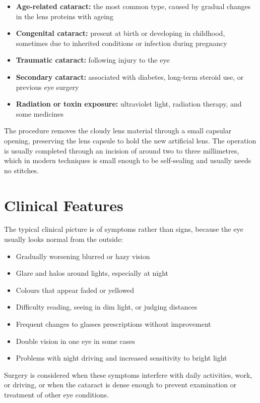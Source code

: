 \begin{itemize}
    \item \textbf{Age-related cataract:} the most common type, caused by gradual changes in the lens proteins with ageing
    \item \textbf{Congenital cataract:} present at birth or developing in childhood, sometimes due to inherited conditions or infection during pregnancy
    \item \textbf{Traumatic cataract:} following injury to the eye
    \item \textbf{Secondary cataract:} associated with diabetes, long-term steroid use, or previous eye surgery
    \item \textbf{Radiation or toxin exposure:} ultraviolet light, radiation therapy, and some medicines
\end{itemize}

The procedure removes the cloudy lens material through a small capsular opening, preserving the lens capsule to hold the new artificial lens. The operation is usually completed through an incision of around two to three millimetres, which in modern techniques is small enough to be self-sealing and usually needs no stitches.

\section*{Clinical Features}
The typical clinical picture is of symptoms rather than signs, because the eye usually looks normal from the outside:

\begin{itemize}
    \item Gradually worsening blurred or hazy vision
    \item Glare and halos around lights, especially at night
    \item Colours that appear faded or yellowed
    \item Difficulty reading, seeing in dim light, or judging distances
    \item Frequent changes to glasses prescriptions without improvement
    \item Double vision in one eye in some cases
    \item Problems with night driving and increased sensitivity to bright light
\end{itemize}

Surgery is considered when these symptoms interfere with daily activities, work, or driving, or when the cataract is dense enough to prevent examination or treatment of other eye conditions.

